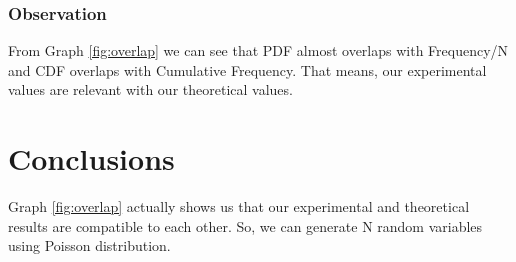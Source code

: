 \documentclass[12pt]{article}
\begin{document}
\subsubsection{Observation}
From Graph \ref{fig:overlap} we can see that PDF almost overlaps with Frequency/N and CDF overlaps with Cumulative Frequency. That means, our experimental values are relevant with our theoretical values. 

\section{Conclusions}
Graph \ref{fig:overlap} actually shows us that our experimental and theoretical results are compatible to each other. So, we can generate N random variables using Poisson distribution. 
\end{document}
